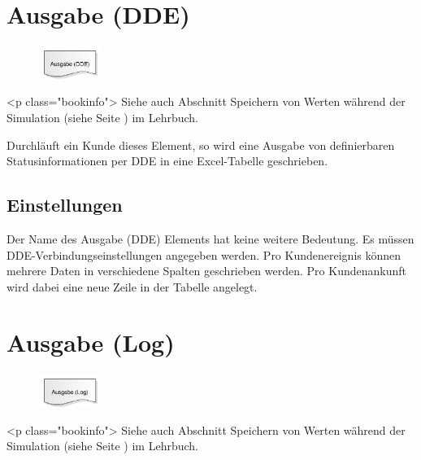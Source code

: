 \section{Ausgabe (DDE)}
\label{ref:ModelElementOutputDDE}

\begin{figure}
\vspace{-22pt}
\includegraphics[width=2cm]{imageModelElementOutputDDE.png}
\vspace{-22pt}
\end{figure}

<p class="bookinfo">
Siehe auch Abschnitt Speichern von Werten während der Simulation (siehe Seite \pageref{ref:book:9.3.3}) im Lehrbuch.

Durchläuft ein Kunde dieses Element, so wird eine Ausgabe von definierbaren Statusinformationen per
DDE in eine Excel-Tabelle geschrieben.

\subsection*{Einstellungen}

Der Name des Ausgabe (DDE) Elements hat keine weitere Bedeutung. Es müssen DDE-Verbindungseinstellungen
angegeben werden.
Pro Kundenereignis können mehrere Daten in verschiedene Spalten geschrieben werden. Pro Kundenankunft
wird dabei eine neue Zeile in der Tabelle angelegt.


\section{Ausgabe (Log)}
\label{ref:ModelElementOutputLog}

\begin{figure}
\vspace{-22pt}
\includegraphics[width=2cm]{imageModelElementOutputLog.png}
\vspace{-22pt}
\end{figure}

<p class="bookinfo">
Siehe auch Abschnitt Speichern von Werten während der Simulation (siehe Seite \pageref{ref:book:9.3.3}) im Lehrbuch.

